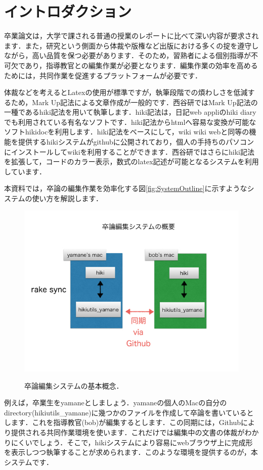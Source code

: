 
\section{イントロダクション}
卒業論文は，大学で課される普通の授業のレポートに比べて深い内容が要求されます．また，研究という側面から体裁や版権など出版における多くの掟を遵守しながら，高い品質を保つ必要があります．そのため，習熟者による個別指導が不可欠であり，指導教官との編集作業が必要となります．編集作業の効率を高めるためには，共同作業を促進するプラットフォームが必要です．

体裁などを考えるとLatexの使用が標準ですが，執筆段階での煩わしさを低減するため，Mark Up記法による文章作成が一般的です\cite{DocGuide}．西谷研ではMark Up記法の一種であるhiki記法を用いて執筆します．hiki記法は，日記web appliのhiki diaryでも利用されている有名なソフトです．hiki記法からhtmlへ容易な変換が可能なソフトhikidocを利用します．hiki記法をベースにして，wiki wiki webと同等の機能を提供するhikiシステムがgithubに公開されており，個人の手持ちのパソコンにインストールしてwikiを利用することができます．西谷研ではさらにhiki記法を拡張して，コードのカラー表示，数式のlatex記述が可能となるシステムを利用しています．

本資料では，卒論の編集作業を効率化する図\ref{fig:SystemOutline}に示すようなシステムの使い方を解説します．

\begin{figure}[htbp]\begin{center}
\includegraphics[width=12cm,bb= 0 0 737 553]{../figs/./hikiutils_bob.002.jpeg}
\caption{卒論編集システムの基本概念．}
\label{fig:SystemOutline}
\label{default}\end{center}\end{figure}
例えば，卒業生をyamaneとしましょう．yamaneの個人のMacの自分のdirectory(hikiutils\_yamane)に幾つかのファイルを作成して卒論を書いているとします．これを指導教官(bob)が編集するとします．この同期には，Githubにより提供される共同作業環境を使います．これだけでは編集中の文書の体裁がわかりにくいでしょう．そこで，hikiシステムにより容易にwebブラウザ上に完成形を表示しつつ執筆することが求められます．このような環境を提供するのが，本システムです．

